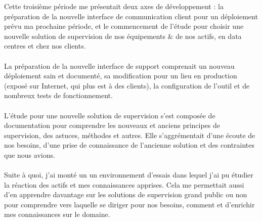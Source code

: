 \begin{resumo}
    Cette troisième période me présentait deux axes de développement : la préparation de la nouvelle interface de communication client pour un déploiement prévu ma prochaine période, et le commencement de l'étude pour choisir une nouvelle solution de supervision de nos équipements \& de nos actifs, en data centres et chez nos clients. 
    \\ \\
    La préparation de la nouvelle interface de support comprenait un nouveau déploiement sain et documenté, sa modification pour un lieu en production (exposé sur Internet, qui plus est à des clients), la configuration de l'outil et de nombreux tests de fonctionnement.
    \\ \\
    L'étude pour une nouvelle solution de supervision s'est composée de documentation pour comprendre les nouveaux et anciens principes de supervision, des astuces, méthodes et autres. Elle s'aggrémentait d'une écoute de nos besoins, d'une prise de connaissance de l'ancienne solution et des contraintes que nous avions.
    \\ \\
    Suite à quoi, j'ai monté un un environnement d'essais dans lequel j'ai pu étudier la réaction des actifs et mes connaissances apprises. Cela me permettait aussi d'en apprendre davantage sur les solutions de supervision grand public ou non pour comprendre vers laquelle se diriger pour nos besoins, comment et d'enrichir mes connaissances sur le domaine.
    
    
\end{resumo}